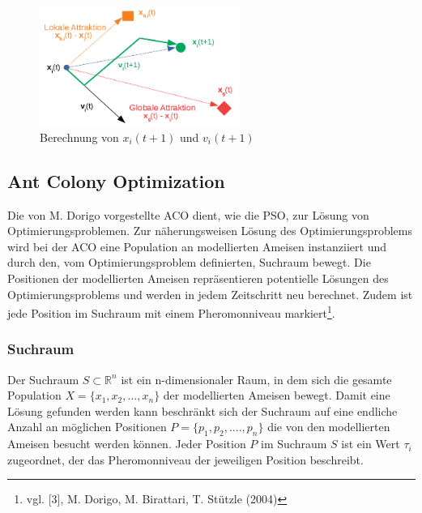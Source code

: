 \documentclass[a4paper, 11pt]{article}
\begin{document}
\begin{figure}[h]
	\begin{center}
		\includegraphics[width=0.58\textwidth]{pso}
	\end{center}
	\hspace{1in}\parbox{4in}{\caption[\acs{PSO}, Berechnung von $x_{i}(t+1)$ und $v_{i}(t+1)$]{Berechnung von $x_{i}(t+1)$ und $v_{i}(t+1)$}}
	\label{psoabb}
\end{figure}
\newpage
\subsection{Ant Colony Optimization}
Die von M. Dorigo vorgestellte \acs{ACO} dient, wie die \acs{PSO}, zur Lösung von Optimierungsproblemen. Zur näherungsweisen Lösung des Optimierungsproblems wird bei der \acs{ACO} eine Population an modellierten Ameisen instanziiert und durch den, vom Optimierungsproblem definierten, Suchraum bewegt. Die Positionen der modellierten Ameisen repräsentieren potentielle Lösungen des Optimierungsproblems und werden in jedem Zeitschritt neu berechnet. Zudem ist jede Position im Suchraum mit einem Pheromonniveau markiert\footnote{vgl. [3], M. Dorigo, M. Birattari, T. Stützle (2004)}.
\subsubsection{Suchraum}
Der Suchraum $S \subset \mathbb{R}^n$ ist ein n-dimensionaler Raum, in dem sich die gesamte Population $X=\{x_{1},x_{2},...,x_{n}\}$ der modellierten Ameisen bewegt. Damit eine Lösung gefunden werden kann beschränkt sich der Suchraum auf eine endliche Anzahl an möglichen Positionen $P=\{p_{1},p_{2},....,p_{n}\}$ die von den modellierten Ameisen besucht werden können. Jeder Position $P$ im Suchraum $S$ ist ein Wert $\tau_{i}$ zugeordnet, der das Pheromonniveau der jeweiligen Position beschreibt.
\end{document}

